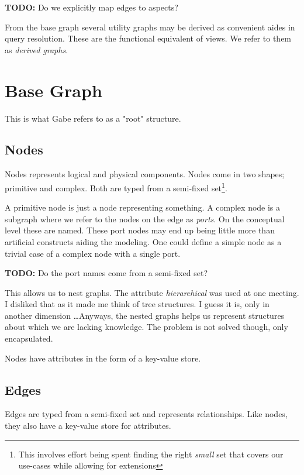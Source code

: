 \documentclass{article}
\begin{document}
\textbf{TODO:} Do we explicitly map edges to aspects?

From the base graph several utility graphs may be derived as convenient aides in query resolution. These are the functional equivalent of views. We refer to them as \textsl{derived graphs}.

\section{Base Graph}

This is what Gabe refers to as a "root" structure.

\subsection{Nodes}

Nodes represents logical and physical components. Nodes come in two shapes; primitive and complex. Both are typed from a semi-fixed set\footnote{This involves effort being spent finding the right \textsl{small} set that covers our use-cases while allowing for extensions}.

A primitive node is just a node representing something. A complex node is a subgraph where we refer to the nodes on the edge as \textsl{ports}. On the conceptual level these are named. These port nodes may end up being little more than artificial constructs aiding the modeling. One could define a simple node as a trivial case of a complex node with a single port.

\textbf{TODO:} Do the port names come from a semi-fixed set?

This allows us to nest graphs. The attribute \textsl{hierarchical} was used at one meeting. I disliked that as it made me think of tree structures. I guess it is, only in another dimension \ldots Anyways, the nested graphs helps us represent structures about which we are lacking knowledge. The problem is not solved though, only encapsulated.

Nodes have attributes in the form of a key-value store.

\subsection{Edges}

Edges are typed from a semi-fixed set and represents relationships. Like nodes, they also have a key-value store for attributes.
\end{document}
